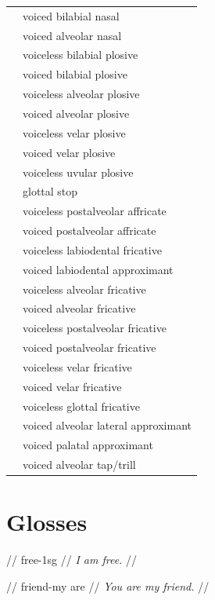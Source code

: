 \documentclass{article}
\begin{document}
\begin{xltabular}{\textwidth}{lL}
   & voiced bilabial nasal \\
   & voiced alveolar nasal \\
   & voiceless bilabial plosive \\
   & voiced bilabial plosive \\
   & voiceless alveolar plosive \\
   & voiced alveolar plosive \\
   & voiceless velar plosive \\
   & voiced velar plosive \\
   & voiceless uvular plosive \\
   & glottal stop \\
   & voiceless postalveolar affricate \\
   & voiced postalveolar affricate \\
   & voiceless labiodental fricative \\
   & voiced labiodental approximant \\
   & voiceless alveolar fricative \\
   & voiced alveolar fricative \\
   & voiceless postalveolar fricative \\
   & voiced postalveolar fricative \\
   & voiceless velar fricative \\
   & voiced velar fricative \\
   & voiceless glottal fricative \\
   & voiced alveolar lateral approximant \\
   & voiced palatal approximant \\
   & voiced alveolar tap/trill \\
\end{xltabular}

\newpage\section{Glosses}

\ex
\begingl
\gla {}  //
 free-{\sc 1sg} //
\glft \textit{I am free.} //
\endgl
\xe

\ex
\begingl
\gla {}   //
 friend-my are //
\glft \textit{You are my friend.} //
\endgl
\xe
\end{document}
